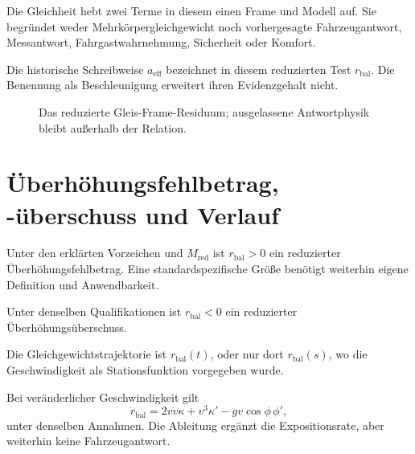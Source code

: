 Die Gleichheit hebt zwei Terme in diesem einen Frame und Modell auf. Sie
begründet weder Mehrkörpergleichgewicht noch vorhergesagte Fahrzeugantwort,
Messantwort, Fahrgastwahrnehmung, Sicherheit oder Komfort.

\begin{definition}
\label{def:dynamics-effective-lateral-acceleration}
Die historische Schreibweise \(a_{\mathrm{eff}}\) bezeichnet in diesem
reduzierten Test \(r_{\mathrm{bal}}\). Die Benennung als Beschleunigung
erweitert ihren Evidenzgehalt nicht.
\end{definition}

\begin{figure}[htbp]
\centering

\caption{Das reduzierte Gleis-Frame-Residuum; ausgelassene Antwortphysik bleibt außerhalb der Relation.}
\label{fig:dynamic-balance-relation}
\end{figure}

\section{Überhöhungsfehlbetrag, -überschuss und Verlauf}

\begin{definition}[Überhöhungsfehlbetrag]
\label{def:cant-deficiency}
Unter den erklärten Vorzeichen und \(M_{\mathrm{red}}\) ist
\(r_{\mathrm{bal}}>0\) ein reduzierter Überhöhungsfehlbetrag. Eine
standardspezifische Größe benötigt weiterhin eigene Definition und
Anwendbarkeit.
\end{definition}

\begin{definition}[Überhöhungsüberschuss]
\label{def:excess-cant}
Unter denselben Qualifikationen ist \(r_{\mathrm{bal}}<0\) ein reduzierter
Überhöhungsüberschuss.
\end{definition}

\begin{definition}[Gleichgewichtstrajektorie]
\label{def:dynamics-balance-trajectory}
Die Gleichgewichtstrajektorie ist \(r_{\mathrm{bal}}(t)\), oder nur dort
\(r_{\mathrm{bal}}(s)\), wo die Geschwindigkeit als Stationsfunktion
vorgegeben wurde.
\end{definition}

Bei veränderlicher Geschwindigkeit gilt
\[
\dot r_{\mathrm{bal}}
=2v\dot v\kappa+v^3\kappa'-gv\cos\phi\,\phi',
\]
unter denselben Annahmen. Die Ableitung ergänzt die Expositionsrate, aber
weiterhin keine Fahrzeugantwort.

